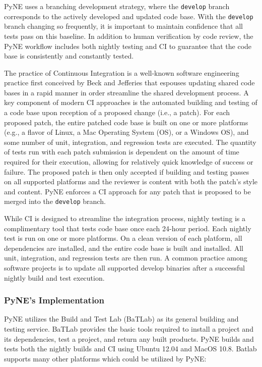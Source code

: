 \documentclass{anstrans}
\begin{document}
PyNE uses a branching
development strategy, where the \texttt{develop} branch corresponds to the
actively developed and updated code base.
With the \texttt{develop} branch changing so frequently, it is important to maintain confidence that all tests pass on this baseline.
In addition to human verification by code review, the PyNE
workflow includes both nightly testing and CI to
guarantee that the code base is consistently and constantly tested.

The practice of Continuous Integration is a well-known software engineering
practice first conceived by Beck and Jefferies \cite{beck1998extreme} that
espouses updating shared code bases in a rapid manner in order streamline the
shared development process. A key component of modern CI approaches is the
automated building and testing of a code base upon reception of a proposed
change (i.e., a patch). For each proposed patch, the entire patched code base is
built on one or more platforms (e.g., a flavor of Linux, a Mac Operating System
(OS), or a Windows OS), and some number of unit, integration, and regression
tests are executed. The quantity of tests run with each patch submission is
dependent on the amount of time required for their execution, allowing for
relatively quick knowledge of success or failure. The proposed patch is then only
accepted if building and testing passes on all supported platforms and the
reviewer is content with both the patch's style and content. PyNE enforces a CI
approach for any patch that is proposed to be merged into the \texttt{develop}
branch.

While CI is designed to streamline the integration process, nightly testing is a
complimentary tool that tests code base once each 24-hour
period. Each nightly test is run on one or more platforms. On a clean version of
each platform, all dependencies are installed, and the entire code base is built
and installed. All unit, integration, and regression tests are then run. A
common practice among software projects is to update all supported develop
binaries after a successful nightly build and test execution.

\subsubsection{PyNE's Implementation}

PyNE utilizes the Build and Test Lab (BaTLab) \cite{batlab_2014} as its general
building and testing service. BaTLab provides the basic tools required to
install a project and its dependencies, test a project, and return any built
products. PyNE builds and tests both the nightly builds and CI using
Ubuntu 12.04 and MacOS 10.8. Batlab supports many other platforms which could be utilized by PyNE:
\end{document}
